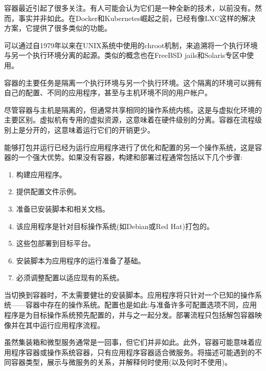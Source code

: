 

容器最近引起了很多关注。有人可能会认为它们是一种全新的技术，以前没有。然而，事实并非如此。在Docker和Kubernetes崛起之前，已经有像LXC这样的解决方案，它提供了很多类似的功能。

可以通过自1979年以来在UNIX系统中使用的chroot机制，来追溯将一个执行环境与另一个执行环境分离的起源。类似的概念也在FreeBSD jails和Solaris专区中使用。

容器的主要任务是隔离一个执行环境与另一个执行环境。这个隔离的环境可以拥有自己的配置、不同的应用程序，甚至与主机环境不同的用户帐户。

尽管容器与主机是隔离的，但通常共享相同的操作系统内核。这是与虚拟化环境的主要区别。虚拟机有专用的虚拟资源，这意味着在硬件级别的分离。容器在流程级别上是分开的，这意味着运行它们的开销更少。

能够打包并运行已经为运行应用程序进行了优化和配置的另一个操作系统，这是容器的一个强大优势。如果没有容器，构建和部署过程通常包括以下几个步骤:

\begin{enumerate}
\item 
构建应用程序。

\item 
提供配置文件示例。

\item 
准备已安装脚本和相关文档。

\item 
该应用程序是针对目标操作系统(如Debian或Red Hat)打包的。

\item 
这些包部署到目标平台。

\item 
安装脚本为应用程序的运行准备了基础。

\item 
必须调整配置以适应现有的系统。
\end{enumerate}

当切换到容器时，不太需要健壮的安装脚本。应用程序将只针对一个已知的操作系统——容器中存在的操作系统。配置也是如此:与准备许多可配置选项不同，应用程序是为目标操作系统预先配置的，并与之一起分发。部署流程只包括解包容器映像并在其中运行应用程序流程。

虽然集装箱和微型服务通常是一回事，但它们并非如此。此外，容器可能意味着应用程序容器或操作系统容器，只有应用程序容器适合微服务。将描述可能遇到的不同容器类型，展示与微服务的关系，并解释何时使用(以及何时不使用)。


